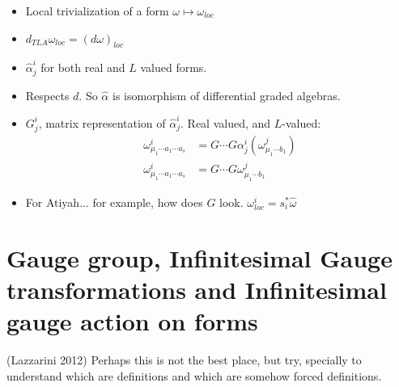 \begin{itemize}
    
\item Local trivialization of a form $\omega \mapsto \omega_{loc}$

\item $d_{TLA}\omega_{loc} = (d \omega)_{loc}$

\item $\hat \alpha^i_j$ for both real and $L$ valued forms.

\item Respects $d$. So $\hat \alpha$ is isomorphism of differential graded algebras.

\item $G^i_j$, matrix representation of $\hat \alpha^i_j$. Real valued, and $L$-valued:
    \begin{align}
        \omega^i_{\mu_1 \cdots a_1 \cdots a_s} &= G\cdots G \alpha^i_j(\omega^j_{\mu_1 \cdots b_1}) \\
        \omega^i_{\mu_1 \cdots a_1 \cdots a_s} &= G\cdots G \omega^j_{\mu_1 \cdots b_1}
    \end{align}

\item For Atiyah... for example, how does $G$ look. $\omega^i_{loc} = s_i^* \hat \omega$
    
\end{itemize}

\section{Gauge group, Infinitesimal Gauge transformations and Infinitesimal gauge action on forms}

(Lazzarini 2012) Perhaps this is not the best place, but try, specially to understand which are definitions and which are somehow forced definitions.

